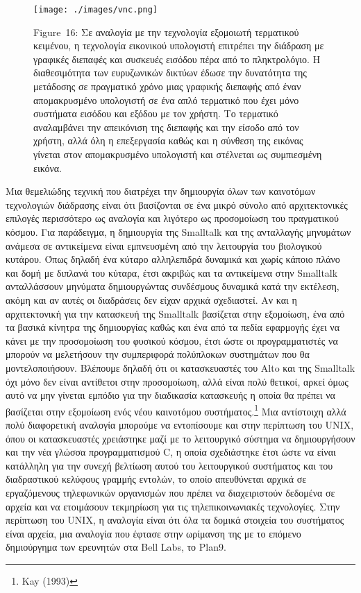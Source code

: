 \documentclass[
]{article}
\begin{document}
\leavevmode{}%
\begin{figure}
\hypertarget{fig:vnc}{%
\centering
\texttt{[image: ./images/vnc.png]}
\caption{Figure~16: Σε αναλογία με την τεχνολογία εξομοιωτή τερματικού
κειμένου, η τεχνολογία εικονικού υπολογιστή επιτρέπει την διάδραση με
γραφικές διεπαφές και συσκευές εισόδου πέρα από το πληκτρολόγιο. Η
διαθεσιμότητα των ευρυζωνικών δικτύων έδωσε την δυνατότητα της μετάδοσης
σε πραγματικό χρόνο μιας γραφικής διεπαφής από έναν απομακρυσμένο
υπολογιστή σε ένα απλό τερματικό που έχει μόνο συστήματα εισόδου και
εξόδου με τον χρήστη. Το τερματικό αναλαμβάνει την απεικόνιση της
διεπαφής και την είσοδο από τον χρήστη, αλλά όλη η επεξεργασία καθώς και
η σύνθεση της εικόνας γίνεται στον απομακρυσμένο υπολογιστή και
στέλνεται ως συμπιεσμένη εικόνα.}\label{fig:vnc}
}
\end{figure}

Μια θεμελιώδης τεχνική που διατρέχει την δημιουργία όλων των καινοτόμων
τεχνολογιών διάδρασης είναι ότι βασίζονται σε ένα μικρό σύνολο από
αρχιτεκτονικές επιλογές περισσότερο ως αναλογία και λιγότερο ως
προσομοίωση του πραγματικού κόσμου. Για παράδειγμα, η δημιουργία της
Smalltalk και της ανταλλαγής μηνυμάτων ανάμεσα σε αντικείμενα είναι
εμπνευσμένη από την λειτουργία του βιολογικού κυτάρου. Όπως δηλαδή ένα
κύταρο αλληλεπιδρά δυναμικά και χωρίς κάποιο πλάνο και δομή με διπλανά
του κύταρα, έτσι ακριβώς και τα αντικείμενα στην Smalltalk ανταλλάσσουν
μηνύματα δημιουργώντας συνδέσμους δυναμικά κατά την εκτέλεση, ακόμη και
αν αυτές οι διαδράσεις δεν είχαν αρχικά σχεδιαστεί. Αν και η
αρχιτεκτονική για την κατασκευή της Smalltalk βασίζεται στην εξομοίωση,
ένα από τα βασικά κίνητρα της δημιουργίας καθώς και ένα από τα πεδία
εφαρμογής έχει να κάνει με την προσομοίωση του φυσικού κόσμου, έτσι ώστε
οι προγραμματιστές να μπορούν να μελετήσουν την συμπεριφορά πολύπλοκων
συστημάτων που θα μοντελοποιήσουν. Βλέπουμε δηλαδή ότι οι κατασκευαστές
του Alto και της Smalltalk όχι μόνο δεν είναι αντίθετοι στην
προσομοίωση, αλλά είναι πολύ θετικοί, αρκεί όμως αυτό να μην γίνεται
εμπόδιο για την διαδικασία κατασκευής η οποία θα πρέπει να βασίζεται
στην εξομοίωση ενός νέου καινοτόμου συστήματος.\footnote{Kay (1993)} Μια
αντίστοιχη αλλά πολύ διαφορετική αναλογία μπορούμε να εντοπίσουμε και
στην περίπτωση του UNIX, όπου οι κατασκευαστές χρειάστηκε μαζί με το
λειτουργικό σύστημα να δημιουργήσουν και την νέα γλώσσα προγραμματισμού
C, η οποία σχεδιάστηκε έτσι ώστε να είναι κατάλληλη για την συνεχή
βελτίωση αυτού του λειτουργικού συστήματος και του διαδραστικού κελύφους
γραμμής εντολών, το οποίο απευθύνεται αρχικά σε εργαζόμενους τηλεφωνικών
οργανισμών που πρέπει να διαχειριστούν δεδομένα σε αρχεία και να
ετοιμάσουν τεκμηρίωση για τις τηλεπικοινωνιακές τεχνολογίες. Στην
περίπτωση του UNIX, η αναλογία είναι ότι όλα τα δομικά στοιχεία του
συστήματος είναι αρχεία, μια αναλογία που έφτασε στην ωρίμανση της με το
επόμενο δημιούργημα των ερευνητών στα Bell Labs, το Plan9.
\end{document}
